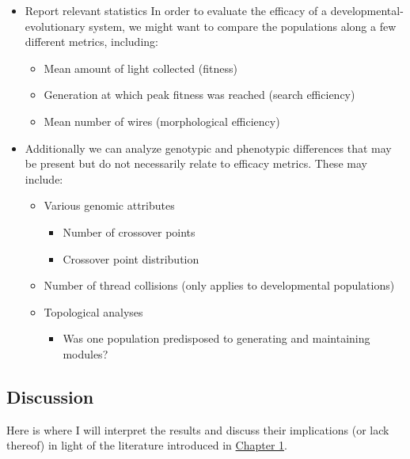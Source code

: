 \documentclass[11pt]{article}
\begin{document}
\begin{itemize}
\item Report relevant statistics
In order to evaluate the efficacy of a developmental-evolutionary system, we might want to compare the populations along a few different metrics, including:
\begin{itemize}
\item Mean amount of light collected (fitness)
\item Generation at which peak fitness was reached (search efficiency)
\item Mean number of wires (morphological efficiency)
\end{itemize}

\item Additionally we can analyze genotypic and phenotypic differences that may be present but do not necessarily relate to efficacy metrics. These may include:
\begin{itemize}
\item Various genomic attributes
\begin{itemize}
\item Number of crossover points
\item Crossover point distribution
\end{itemize}
\item Number of thread collisions (only applies to developmental populations)
\item Topological analyses 
\begin{itemize}
\item Was one population predisposed to generating and maintaining modules?
\end{itemize}
\end{itemize}
\end{itemize}

\subsection*{Discussion}
\label{sec:orgheadline40}
Here is where I will interpret the results and discuss their implications (or lack thereof) in light of the literature introduced in \hyperref[sec:orgheadline13]{Chapter 1}.
\end{document}
